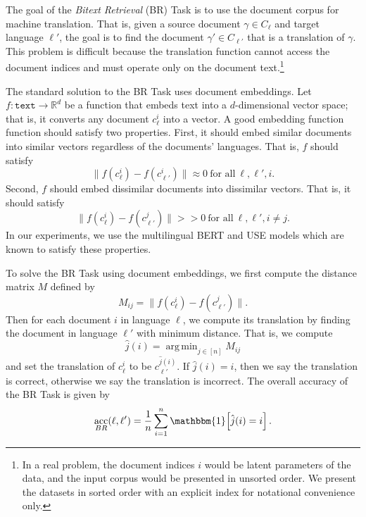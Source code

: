 \documentclass[11pt]{article}
\newcommand{\ltwo}[1]{\lVert{#1}\rVert}
\newcommand{\indicator}[1]{\mathbbm{1}\!\left[{#1}\right]}
\newcommand{\R}{\mathbb R}
\newcommand{\TEXT}{\texttt{text}}
\newcommand{\defn}[1]{\emph{{#1}}}
\DeclareMathOperator*{\argmin}{arg\,min}
\DeclareMathOperator{\acc}{acc}
\begin{document}
The goal of the \defn{Bitext Retrieval} (BR) Task is to use the document corpus for machine translation.
That is, given a source document $\gamma\in C_\ell$ and target language $\ell'$,
the goal is to find the document $\gamma' \in C_{\ell'}$ that is a translation of $\gamma$.
This problem is difficult because the translation function cannot access the document indices and must operate only on the document text.\footnote{%
In a real problem, the document indices $i$ would be latent parameters of the data,
and the input corpus would be presented in unsorted order.
We present the datasets in sorted order with an explicit index for notational convenience only.}

The standard solution to the BR Task uses document embeddings.
Let $f : \TEXT \to \R^d$ be a function that embeds text into a $d$-dimensional vector space;
that is, it converts any document $c_\ell^i$ into a vector. 
A good embedding function function should satisfy two properties.
First, it should embed similar documents into similar vectors regardless of the documents' languages.
That is, $f$ should satisfy
\begin{equation}
    \ltwo{f(c_{\ell}^i) - f(c_{\ell'}^i)} \approx 0 ~\text{for all}~ \ell,\ell',i
    .
\end{equation}
Second, $f$ should embed dissimilar documents into dissimilar vectors.
That is, it should satisfy
\begin{equation}
    \ltwo{f(c_{\ell}^i) - f(c_{\ell'}^j)} >\!\!> 0 ~\text{for all}~ \ell,\ell',i\ne j
    .
\end{equation}
In our experiments, we use the multilingual BERT \cite{} and USE \cite{} models which are known to satisfy these properties.

To solve the BR Task using document embeddings, we first compute the distance matrix $M$ defined by 
\begin{equation}
    \label{eq:M}
    M_{ij} = \ltwo{ f (c_{\ell}^i) - f(c_{\ell'}^j ) }.
\end{equation}
Then for each document $i$ in language $\ell$, we compute its translation by finding the document in language $\ell'$ with minimum distance.
That is, we compute
\begin{equation}
    \label{eq:jhat}
    \hat j(i) = \argmin_{j\in[n]} M_{ij}
\end{equation}
and set the translation of $c_{\ell}^i$ to be $c_{\ell'}^{\hat j(i)}$.
If $\hat j(i) = i$, then we say the translation is correct,
otherwise we say the translation is incorrect.
The overall accuracy of the BR Task is given by
\begin{equation}
    \acc_{BR}(\ell,\ell') = \frac 1 n \sum_{i=1}^n \indicator{\hat j(i) = i}
    .
\end{equation}
\end{document}
